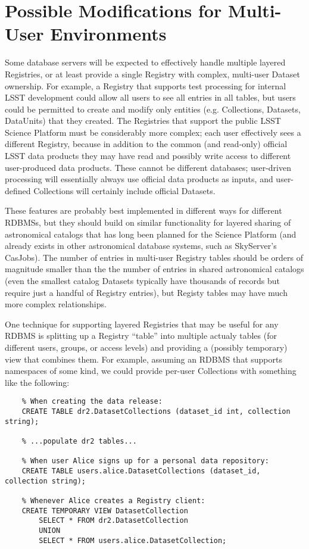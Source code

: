 \documentclass[DM,toc]{lsstdoc}
\begin{document}
\appendix

\section{Possible Modifications for Multi-User Environments}
\label{sec:multi-user-environments}

Some database servers will be expected to effectively handle multiple layered Registries, or at least provide a single Registry with complex, multi-user Dataset ownership.
For example, a Registry that supports test processing for internal LSST development could allow all users to see all entries in all tables, but users could be permitted to create and modify only entities (e.g. Collections, Datasets, DataUnits) that they created.
The Registries that support the public LSST Science Platform must be considerably more complex; each user effectively sees a different Registry, because in addition to the common (and read-only) official LSST data products they may have read and possibly write access to different user-produced data products.
These cannot be different databases; user-driven processing will essentially always use official data products as inputs, and user-defined Collections will certainly include official Datasets.

These features are probably best implemented in different ways for different RDBMSs, but they should build on similar functionality for layered sharing of astronomical catalogs that has long been planned for the Science Platform (and already exists in other astronomical database systems, such as SkyServer's CasJobs).
The number of entries in multi-user Registry tables should be orders of magnitude smaller than the the number of entries in shared astronomical catalogs (even the smallest catalog Datasets typically have thousands of records but require just a handful of Registry entries), but Registy tables may have much more complex relationships.

One technique for supporting layered Registries that may be useful for any RDBMS is splitting up a Registry ``table'' into multiple actualy tables (for different users, groups, or access levels) and providing a (possibly temporary) view that combines them.
For example, assuming an RDBMS that supports namespaces of some kind, we could provide per-user Collections with something like the following:
\begin{verbatim}
    % When creating the data release:
    CREATE TABLE dr2.DatasetCollections (dataset_id int, collection string);

    % ...populate dr2 tables...

    % When user Alice signs up for a personal data repository:
    CREATE TABLE users.alice.DatasetCollections (dataset_id, collection string);

    % Whenever Alice creates a Registry client:
    CREATE TEMPORARY VIEW DatasetCollection
        SELECT * FROM dr2.DatasetCollection
        UNION
        SELECT * FROM users.alice.DatasetCollection;
\end{verbatim}
\end{document}

